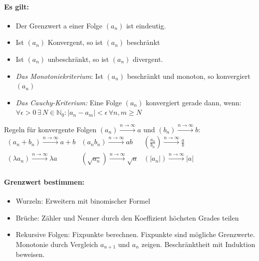 \documentclass[6pt,a4paper]{scrartcl}
\newcommand{\abs}[1]{\ensuremath{\left\vert#1\right\vert}}
\begin{document}
\begin{multicols*}{2}
\paragraph{Es gilt:}
\begin{itemize}\itemsep0pt
\item Der Grenzwert a einer Folge $(a_n)$ ist eindeutig.
\item Ist $(a_n)$ Konvergent, so ist $(a_n)$ beschränkt
\item Ist $(a_n)$ unbeschränkt, so ist $(a_n)$ divergent.
\item \emph{Das Monotoniekriterium}: Ist $(a_n)$ beschränkt und monoton, so konvergiert $(a_n)$
\item \emph{Das Cauchy-Kriterium:} Eine Folge $(a_n)$ konvergiert gerade dann, wenn: \\ $\forall \epsilon >0 \, \exists \,  N \in \mathbb N_0: \abs{a_n - a_m} < \epsilon \, \forall n, m \ge N$
\end{itemize}
Regeln für konvergente Folgen $(a_n) \overset{n \rightarrow \infty}{\longrightarrow} a$ und $(b_n) \overset{n \rightarrow \infty}{\longrightarrow} b$:\\
$\begin{array}{lll}
(a_n+b_n) \overset{n \rightarrow \infty}{\longrightarrow} a+b & (a_n b_n) \overset{n \rightarrow \infty}{\longrightarrow} ab & (\frac{a_n}{b_n}) \overset{n \rightarrow \infty}{\longrightarrow} \frac{a}{b}\\
(\lambda a_n) \overset{n \rightarrow \infty}{\longrightarrow} \lambda a & (\sqrt{a_n}) \overset{n \rightarrow \infty}{\longrightarrow} \sqrt{a} & (|a_n|) \overset{n \rightarrow \infty}{\longrightarrow} |a|
\end{array}$
\paragraph{Grenzwert bestimmen:}
\begin{itemize}\itemsep0pt
\item Wurzeln: Erweitern mit binomischer Formel
\item Brüche: Zähler und Nenner durch den Koeffizient höchsten Grades teilen
\item Rekursive Folgen: Fixpunkte berechnen. Fixpunkte sind mögliche Grenzwerte. Monotonie durch Vergleich $a_{n+1}$ und $a_n$ zeigen. Beschränktheit mit Induktion beweisen.
\end{itemize}


\end{multicols*}
\end{document}
